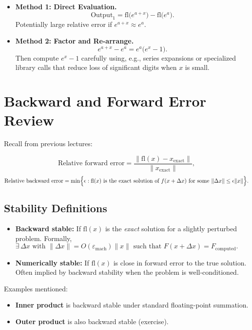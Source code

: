\begin{itemize}
  \item \textbf{Method 1: Direct Evaluation.}
  \[
    \mathrm{Output}_1 = \mathrm{fl}\bigl(e^{a+x}\bigr) - \mathrm{fl}\bigl(e^a\bigr).
  \]
  Potentially large relative error if $e^{a+x} \approx e^a$.

  \item \textbf{Method 2: Factor and Re-arrange.}
  \[
    e^{a+x} - e^a = e^a \bigl(e^x - 1\bigr).
  \]
  Then compute $e^x - 1$ carefully using, e.g., series expansions or specialized library calls that reduce loss of significant digits when $x$ is small.  
\end{itemize}

\section*{Backward and Forward Error Review}

Recall from previous lectures:

\[
\text{Relative forward error} 
= \frac{\|\mathrm{fl}(x) - x_{\mathrm{exact}}\|}{\|x_{\mathrm{exact}}\|},
\]
\[
\text{Relative backward error}
= \min\Bigl\{ \epsilon : \mathrm{fl}(x) \text{ is the exact solution of } f(x+\Delta x) \text{ for some } \|\Delta x\| \le \epsilon \|x\|\Bigr\}.
\]

\subsection*{Stability Definitions}

\begin{itemize}
    \item \textbf{Backward stable:} If $\mathrm{fl}(x)$ is the \emph{exact} solution for a slightly perturbed problem. Formally, $\exists\,\Delta x \text{ with } \|\Delta x\| = O(\varepsilon_{\mathrm{mach}}) \|x\|\text{ such that } F(x+\Delta x) = F_{\mathrm{computed}}.$
    \item \textbf{Numerically stable:} If $\mathrm{fl}(x)$ is close in forward error to the true solution. Often implied by backward stability when the problem is well-conditioned.
\end{itemize}

Examples mentioned:
\begin{itemize}
    \item \textbf{Inner product} is backward stable under standard floating-point summation.
    \item \textbf{Outer product} is also backward stable (exercise).
\end{itemize}

